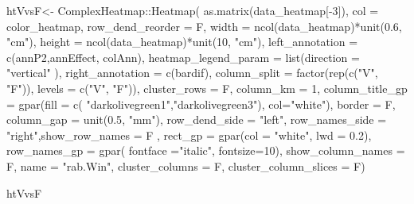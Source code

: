 \documentclass[]{interact}
\theoremstyle{plain}%
\theoremstyle{definition}
\theoremstyle{remark}
\newenvironment{Shaded}{\begin{snugshade}}{\end{snugshade}}
\newcommand{\AttributeTok}[1]{\textcolor[rgb]{0.77,0.63,0.00}{#1}}
\newcommand{\DecValTok}[1]{\textcolor[rgb]{0.00,0.00,0.81}{#1}}
\newcommand{\FloatTok}[1]{\textcolor[rgb]{0.00,0.00,0.81}{#1}}
\newcommand{\FunctionTok}[1]{\textcolor[rgb]{0.00,0.00,0.00}{#1}}
\newcommand{\NormalTok}[1]{#1}
\newcommand{\OtherTok}[1]{\textcolor[rgb]{0.56,0.35,0.01}{#1}}
\newcommand{\SpecialCharTok}[1]{\textcolor[rgb]{0.00,0.00,0.00}{#1}}
\newcommand{\StringTok}[1]{\textcolor[rgb]{0.31,0.60,0.02}{#1}}
\begin{document}
\begin{Shaded}
\begin{Highlighting}[]
\NormalTok{htVvsF}\OtherTok{\textless{}{-}}\NormalTok{  ComplexHeatmap}\SpecialCharTok{::}\FunctionTok{Heatmap}\NormalTok{(}
  \FunctionTok{as.matrix}\NormalTok{(data\_heatmap[}\SpecialCharTok{{-}}\DecValTok{3}\NormalTok{]), }\AttributeTok{col =}\NormalTok{ color\_heatmap, }\AttributeTok{row\_dend\_reorder =}\NormalTok{ F, }
  \AttributeTok{width =} \FunctionTok{ncol}\NormalTok{(data\_heatmap)}\SpecialCharTok{*}\FunctionTok{unit}\NormalTok{(}\FloatTok{0.6}\NormalTok{, }\StringTok{"cm"}\NormalTok{),}
  \AttributeTok{height =} \FunctionTok{ncol}\NormalTok{(data\_heatmap)}\SpecialCharTok{*}\FunctionTok{unit}\NormalTok{(}\DecValTok{10}\NormalTok{, }\StringTok{"cm"}\NormalTok{),}
  \AttributeTok{left\_annotation =}  \FunctionTok{c}\NormalTok{(annP2,annEffect, colAnn),}
  \AttributeTok{heatmap\_legend\_param =} \FunctionTok{list}\NormalTok{(}\AttributeTok{direction =} \StringTok{"vertical"}\NormalTok{ ),}
  \AttributeTok{right\_annotation =} \FunctionTok{c}\NormalTok{(bardif),}
  \AttributeTok{column\_split =} \FunctionTok{factor}\NormalTok{(}\FunctionTok{rep}\NormalTok{(}\FunctionTok{c}\NormalTok{(}\StringTok{"V"}\NormalTok{, }\StringTok{"F"}\NormalTok{)), }\AttributeTok{levels =} \FunctionTok{c}\NormalTok{(}\StringTok{"V"}\NormalTok{, }\StringTok{"F"}\NormalTok{)),}
  \AttributeTok{cluster\_rows =}\NormalTok{ F,}
  \AttributeTok{column\_km =} \DecValTok{1}\NormalTok{, }
  \AttributeTok{column\_title\_gp =} \FunctionTok{gpar}\NormalTok{(}\AttributeTok{fill =} \FunctionTok{c}\NormalTok{(}
  \StringTok{"darkolivegreen1"}\NormalTok{,}\StringTok{"darkolivegreen3"}\NormalTok{), }\AttributeTok{col=}\StringTok{"white"}\NormalTok{),}
   \AttributeTok{border =}\NormalTok{ F, }\AttributeTok{column\_gap =} \FunctionTok{unit}\NormalTok{(}\FloatTok{0.5}\NormalTok{, }\StringTok{"mm"}\NormalTok{), }\AttributeTok{row\_dend\_side =} \StringTok{"left"}\NormalTok{,}
  \AttributeTok{row\_names\_side =} \StringTok{"right"}\NormalTok{,}\AttributeTok{show\_row\_names =}\NormalTok{ F ,}
  \AttributeTok{rect\_gp =} \FunctionTok{gpar}\NormalTok{(}\AttributeTok{col =} \StringTok{"white"}\NormalTok{, }\AttributeTok{lwd =} \FloatTok{0.2}\NormalTok{), }\AttributeTok{row\_names\_gp =} \FunctionTok{gpar}\NormalTok{(}
  \AttributeTok{fontface =}\StringTok{"italic"}\NormalTok{, }\AttributeTok{fontsize=}\DecValTok{10}\NormalTok{),}
  \AttributeTok{show\_column\_names =}\NormalTok{ F, }\AttributeTok{name =} \StringTok{"rab.Win"}\NormalTok{,}
  \AttributeTok{cluster\_columns =}\NormalTok{ F,}
  \AttributeTok{cluster\_column\_slices =}\NormalTok{ F)}

\NormalTok{htVvsF}
\end{Highlighting}
\end{Shaded}
\end{document}
